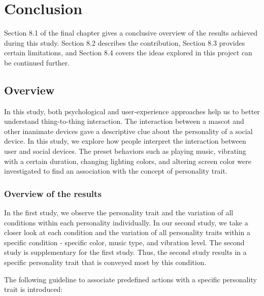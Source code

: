 \chapter{Conclusion}
\label{ch:conclusion}
Section 8.1 of the final chapter gives a conclusive overview of the results achieved during this study.
Section 8.2 describes the contribution, Section 8.3 provides certain limitations,
and Section 8.4 covers the ideas explored in this project can be continued further.

\section{Overview}
\label{sec:overview}
In this study, both psychological and user‐experience approaches help us to better understand thing-to-thing interaction.
The interaction between a mascot and other inanimate devices gave a
descriptive clue about the personality of a social device.
In this study, we explore how people interpret the interaction between user and social devices.
The preset behaviors such as playing music, vibrating with a certain duration, changing lighting colors,
and altering screen color were investigated to find an association with the concept of personality trait.

\subsection{Overview of the results}
\label{subsec:overview-of-the-results}
In the first study, we observe the personality trait and the variation of all
conditions within each personality individually.
In our second study, we take a closer look at each condition and the variation of
all personality traits within a specific condition - specific color, music type, and vibration level.
The second study is supplementary for the first study.
Thus, the second study results in a specific personality trait that is conveyed most by this condition.

The following guideline to associate predefined actions with a specific personality trait is introduced:

